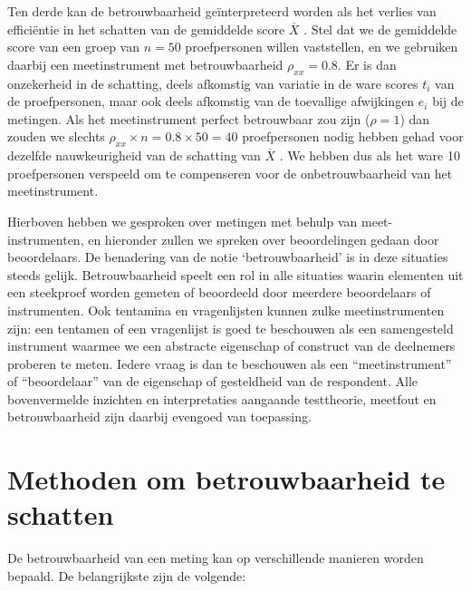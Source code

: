 \documentclass[
]{book}
\begin{document}
Ten derde kan de betrouwbaarheid geïnterpreteerd worden als het verlies
van efficiëntie in het schatten van de gemiddelde score \(\overline{X}\)
\citep[ p.474]{Ferg89}. Stel dat we de gemiddelde score van een groep van
\(n=50\) proefpersonen willen vaststellen, en we gebruiken daarbij een
meetinstrument met betrouwbaarheid \(\rho_{xx}=0.8\). Er is dan
onzekerheid in de schatting, deels afkomstig van variatie in de ware
scores \(t_i\) van de proefpersonen, maar ook deels afkomstig van de
toevallige afwijkingen \(e_i\) bij de metingen. Als het meetinstrument
perfect betrouwbaar zou zijn (\(\rho=1\)) dan zouden we slechts
\(\rho_{xx}\times n = 0.8\times50=40\) proefpersonen nodig hebben gehad
voor dezelfde nauwkeurigheid van de schatting van \(\overline{X}\)
\citep[ p.474]{Ferg89}. We hebben dus als het ware 10 proefpersonen verspeeld
om te compenseren voor de onbetrouwbaarheid van het meetinstrument.

Hierboven hebben we gesproken over metingen met behulp van
meet-instrumenten, en hieronder zullen we spreken over beoordelingen
gedaan door beoordelaars. De benadering van de notie `betrouwbaarheid'
is in deze situaties steeds gelijk. Betrouwbaarheid speelt een rol in
alle situaties waarin elementen uit een steekproef worden gemeten of
beoordeeld door meerdere beoordelaars of instrumenten. Ook tentamina en
vragenlijsten kunnen zulke meetinstrumenten zijn: een tentamen of een
vragenlijst is goed te beschouwen als een samengesteld instrument
waarmee we een abstracte eigenschap of construct van de deelnemers
proberen te meten. Iedere vraag is dan te beschouwen als een
``meetinstrument'' of ``beoordelaar'' van de eigenschap of gesteldheid van
de respondent. Alle bovenvermelde inzichten en interpretaties aangaande
testtheorie, meetfout en betrouwbaarheid zijn daarbij evengoed van
toepassing.

\hypertarget{methoden-om-betrouwbaarheid-te-schatten}{%
\section{Methoden om betrouwbaarheid te schatten}\label{methoden-om-betrouwbaarheid-te-schatten}}

De betrouwbaarheid van een meting kan op verschillende manieren worden
bepaald. De belangrijkste zijn de volgende:
\end{document}
